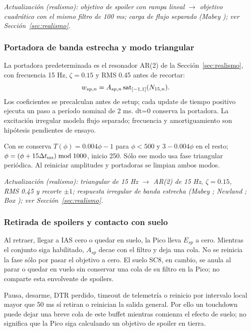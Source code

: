 \textit{Actualización (realismo): objetivo de spoiler con rampa lineal $\rightarrow$ objetivo cuadrático con el mismo filtro de 100 ms; carga de flujo separado (Mabey \cite{mabey1988}); ver Sección~\ref{sec:realismo}.}

\subsubsection{Portadora de banda estrecha y modo triangular}
La portadora predeterminada es el resonador AR(2) de la Sección~\ref{sec:realismo}, con frecuencia 15 Hz, $\zeta=0.15$ y RMS 0.45 antes de recortar:
\begin{equation}w_{sp,n}=A_{sp,n}\operatorname{sat}_{[-1,1]}(N_{15,n}).\end{equation}
Los coeficientes se precalculan antes de setup; cada update de tiempo positivo ejecuta un paso a período nominal de 2 ms. dt=0 conserva la portadora. La excitación irregular modela flujo separado; frecuencia y amortiguamiento son hipótesis pendientes de ensayo.

Con  se conserva $T(\phi)=0.004\phi-1$ para $\phi<500$ y $3-0.004\phi$ en el resto; $\phi=(\phi+15\Delta t_{\rm ms})\bmod1000$, inicio 250. Sólo ese modo usa fase triangular periódica. Al reiniciar amplitudes y portadoras se limpian ambos modos.

\textit{Actualización (realismo): triangular de 15 Hz $\rightarrow$ AR(2) de 15 Hz, $\zeta=0.15$, RMS 0.45 y recorte $\pm1$; respuesta irregular de banda estrecha (Mabey \cite{mabey1988}; Newland \cite{newland1993}; Box \cite{box}); ver Sección~\ref{sec:realismo}.}

\subsubsection{Retirada de spoilers y contacto con suelo}
Al retraer, llegar a IAS cero o quedar en suelo, la Pico lleva $E_{sp}$ a cero. Mientras el conjunto siga habilitado, $A_{sp}$ decae con el filtro y deja una cola. No se reinicia la fase sólo por pasar el objetivo a cero. El suelo SC8, en cambio, se anula al parar o quedar en vuelo sin conservar una cola de su filtro en la Pico; no comparte esta envolvente de spoilers.

Pausa, desarme, DTR perdido, timeout de telemetría o reinicio por intervalo local mayor que 50 ms sí retiran o reinician la salida general. Por ello un touchdown puede dejar una breve cola de este buffet mientras comienza el efecto de suelo; no significa que la Pico siga calculando un objetivo de spoiler en tierra.

